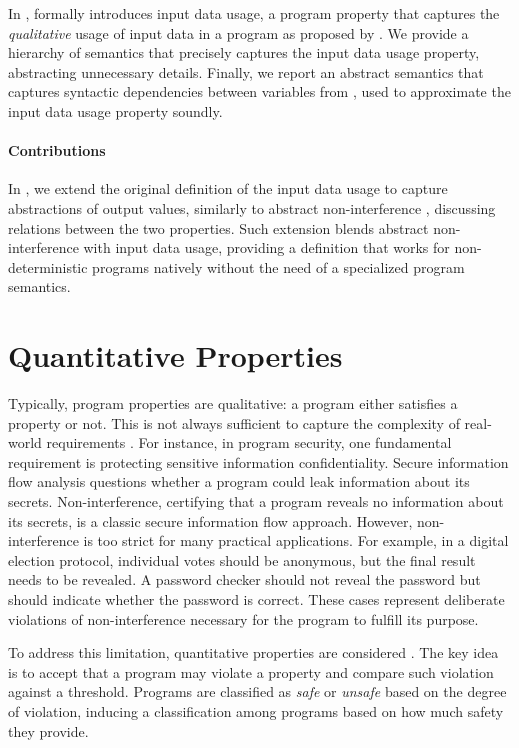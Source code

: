 In ,  formally introduces input data usage, a program property that captures the \emph{qualitative} usage of input data in a program as proposed by \textcite{Urban2018}.
We provide a hierarchy of semantics that precisely captures the input data usage property, abstracting unnecessary details.
Finally, we report an abstract semantics that captures syntactic dependencies between variables from , used to approximate the input data usage property soundly.


\paragraph{Contributions}

In , we extend the original definition of the input data usage to capture abstractions of output values, similarly to abstract non-interference , discussing relations between the two properties.
Such extension blends abstract non-interference with input data usage, providing a definition that works for non-deterministic programs natively without the need of a specialized program semantics.


\section{Quantitative Properties}

Typically, program properties are qualitative: a program either satisfies a property or not.
This is not always sufficient to capture the complexity of real-world requirements .
For instance, in program security, one fundamental requirement is protecting sensitive information confidentiality.
Secure information flow analysis questions whether a program could leak information about its secrets.
Non-interference, certifying that a program reveals no information about its secrets, is a classic secure information flow approach.
However, non-interference is too strict for many practical applications.
For example, in a digital election protocol, individual votes should be anonymous, but the final result needs to be revealed.
A password checker should not reveal the password but should indicate whether the password is correct.
These cases represent deliberate violations of non-interference necessary for the program to fulfill its purpose.

To address this limitation, quantitative properties are considered .
The key idea is to accept that a program may violate a property and compare such violation against a threshold.
Programs are classified as \emph{safe} or \emph{unsafe} based on the degree of violation, inducing a classification among programs based on how much safety they provide.

